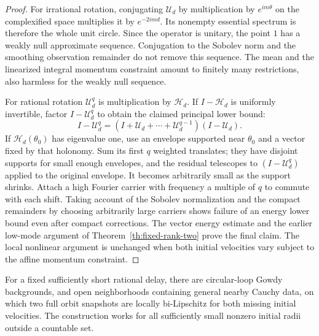 \begin{proof}
For irrational rotation, conjugating $\mathcal U_d$
by multiplication by $e^{im\theta}$ on the
complexified space multiplies it by $e^{-2imd}$.
Its nonempty essential spectrum is therefore the
whole unit circle. Since the operator is unitary,
the point $1$ has a weakly null approximate sequence.
Conjugation to the Sobolev norm and the smoothing
observation remainder do not remove this sequence.
The mean and the linearized integral momentum
constraint amount to finitely many restrictions,
also harmless for the weakly null sequence.

For rational rotation $\mathcal U_d^q$ is
multiplication by $\mathcal H_d$.
If $I-\mathcal H_d$ is uniformly invertible,
factor $I-\mathcal U_d^q$ to obtain the claimed
principal lower bound:
\[
 I-\mathcal U_d^q
    =(I+\mathcal U_d+\cdots+\mathcal U_d^{q-1})(I-\mathcal U_d).
\]
If $\mathcal H_d(\theta_0)$ has eigenvalue one, use
an envelope supported near $\theta_0$ and a vector
fixed by that holonomy. Sum its first $q$ weighted
translates; they have disjoint supports for small
enough envelopes, and the residual telescopes to
$(I-\mathcal U_d^q)$ applied to the original envelope.
It becomes arbitrarily small as the support shrinks.
Attach a high Fourier carrier with frequency a
multiple of $q$ to commute with each shift.
Taking account of the Sobolev normalization and
the compact remainders by choosing arbitrarily
large carriers shows failure of an energy lower
bound even after compact corrections.
The vector energy estimate and the earlier low-mode
argument of Theorem~\ref{th:fixed-rank-two} prove
the final claim. The local nonlinear argument
is unchanged when both initial velocities vary
subject to the affine momentum constraint.
\end{proof}

\begin{theorem}
\label{th:both-circular}
For a fixed sufficiently short rational delay,
there are circular-loop Gowdy backgrounds, and open
neighborhoods containing general nearby Cauchy data,
on which two full orbit snapshots are locally
bi-Lipschitz for both missing initial velocities.
The construction works for all sufficiently small
nonzero initial radii outside a countable set.
\end{theorem}

